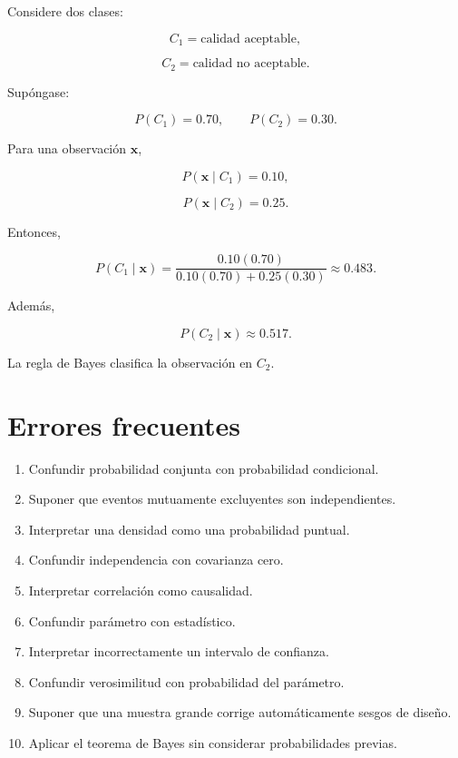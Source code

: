\documentclass[
  spanish,
  10.5pt,
  letterpaper,
  DIV=11,
  numbers=noendperiod,
  oneside,
  open=any]{scrreprt}
\providecommand{\tightlist}{%
  \setlength{\itemsep}{0pt}\setlength{\parskip}{0pt}}
\theoremstyle{definition}
\theoremstyle{definition}
\theoremstyle{plain}
\theoremstyle{remark}
\begin{document}

Considere dos clases:

\[
C_1=\text{calidad aceptable},
\]

\[
C_2=\text{calidad no aceptable}.
\]

Supóngase:

\[
P(C_1)=0.70,
\qquad
P(C_2)=0.30.
\]

Para una observación \(\mathbf{x}\),

\[
P(\mathbf{x}\mid C_1)=0.10,
\]

\[
P(\mathbf{x}\mid C_2)=0.25.
\]

Entonces,

\[
P(C_1\mid\mathbf{x})
=
\frac{
0.10(0.70)
}{
0.10(0.70)+0.25(0.30)
}
\approx 0.483.
\]

Además,

\[
P(C_2\mid\mathbf{x})
\approx 0.517.
\]

La regla de Bayes clasifica la observación en \(C_2\).

\section*{Errores frecuentes}\label{errores-frecuentes-2}


\begin{enumerate}
\def\labelenumi{\arabic{enumi}.}
\tightlist
\item
  Confundir probabilidad conjunta con probabilidad condicional.
\item
  Suponer que eventos mutuamente excluyentes son independientes.
\item
  Interpretar una densidad como una probabilidad puntual.
\item
  Confundir independencia con covarianza cero.
\item
  Interpretar correlación como causalidad.
\item
  Confundir parámetro con estadístico.
\item
  Interpretar incorrectamente un intervalo de confianza.
\item
  Confundir verosimilitud con probabilidad del parámetro.
\item
  Suponer que una muestra grande corrige automáticamente sesgos de
  diseño.
\item
  Aplicar el teorema de Bayes sin considerar probabilidades previas.
\end{enumerate}
\end{document}
